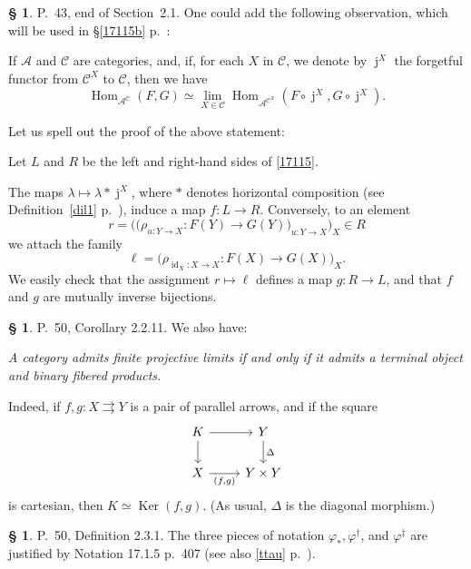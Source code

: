\documentclass[12pt]{article}
\theoremstyle{remark}
\theoremstyle{definition}
\newtheorem{s}[thm]{\S}
\newcommand{\oo}{\operatorname}
\newcommand{\A}{\mathcal A}
\newcommand{\C}{\mathcal C}
\newcommand{\pp}{\varphi}
\newcommand{\parar}{\rightrightarrows}
\DeclareMathOperator{\id}{id}
\DeclareMathOperator{\Hom}{Hom}
\DeclareMathOperator{\Ker}{Ker}
\begin{document}
%

\begin{s}
P.~43, end of Section~2.1. One could add the following observation, which will be used in \S\ref{17115b} p.~\pageref{17115b}: 

If $\A$ and $\C$ are categories, and, if, for each $X$ in $\C$, we denote by $\oo j^X$ the forgetful functor from $\C^X$ to $\C$, then we have
%
\begin{equation}\label{17115}
\Hom_{\A^\C}(F,G)\simeq\lim_{X\in\C}\Hom_{\A^{\C^X}}(F\circ\oo j^X,G\circ\oo j^X).
\end{equation}

Let us spell out the proof of the above statement: 

Let $L$ and $R$ be the left and right-hand sides of \eqref{17115}. 

The maps $\lambda\mapsto\lambda*\oo j^X$, where $*$ denotes horizontal composition (see Definition~\ref{dil1} p.~\pageref{dil1}), induce a map $f:L\to R$. Conversely, to an element  
$$
r=\Big(\big(\rho_{u:Y\to X}:F(Y)\to G(Y)\big)_{u:Y\to X}\Big)_X\in R
$$ 
we attach the family
$$
\ell=\big(\rho_{\id_X:X\to X}:F(X)\to G(X)\big)_X.
$$ 
We easily check that the assignment $r\mapsto\ell$ defines a map $g:R\to L$, and that $f$ and $g$ are mutually inverse bijections.
\end{s}

%

\begin{s}\label{fpl}
P.~50, Corollary 2.2.11. We also have:

\emph{A category admits finite projective limits if and only if it admits a terminal object and binary fibered products.}

Indeed, if $f,g:X\parar Y$ is a pair of parallel arrows, and if the square 
$$
\begin{tikzcd}
K\ar{d}\ar{r}&Y\ar{d}{\Delta}\\ 
X\ar{r}[swap]{(f,g)}&Y\times Y
\end{tikzcd}
$$
is cartesian, then $K\simeq\Ker(f,g)$. (As usual, $\Delta$ is the diagonal morphism.)
\end{s}

%

\begin{s}
P.~50, Definition 2.3.1. The three pieces of notation $\pp_*,\pp^\dagger$, and $\pp^\ddagger$ are justified by Notation 17.1.5 p.~407 (see also \eqref{ttau} p.~\pageref{ttau}). 
\end{s}

%
\end{document}
